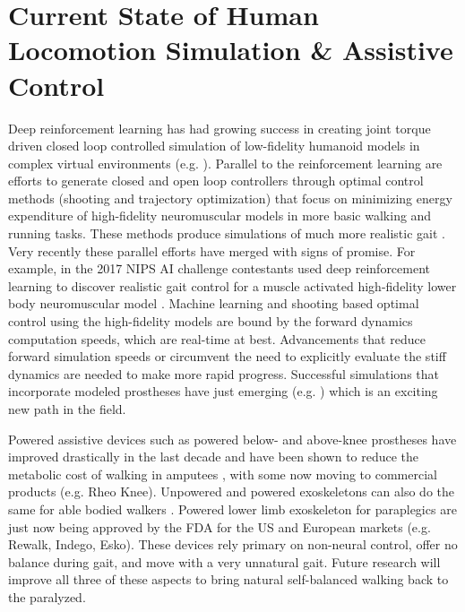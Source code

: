 \documentclass[letter,titlepage]{article}
\begin{document}
\section{Current State of Human Locomotion Simulation \& Assistive Control%
  \label{current-state-of-human-locomotion-simulation-assistive-control}%
}

Deep reinforcement learning has had growing success in creating joint torque
driven closed loop controlled simulation of low-fidelity humanoid models in
complex virtual environments (e.g. \cite{Tan2014,Heess2017}). Parallel to the
reinforcement learning are efforts to generate closed and open loop controllers
through optimal control methods (shooting and trajectory optimization) that
focus on minimizing energy expenditure of high-fidelity neuromuscular models in
more basic walking and running tasks. These methods produce simulations of much
more realistic gait \cite{Ackermann2010,vandenBogert2011,Wang2012,Geijtenbeek2013,Mordatch2013,Uchida2016,Dembia2017}. Very recently
these parallel efforts have merged with signs of promise. For example, in the
2017 NIPS AI challenge contestants used deep reinforcement learning to discover
realistic gait control for a muscle activated high-fidelity lower body
neuromuscular model \cite{Kidzinski2017}. Machine learning and shooting based
optimal control using the high-fidelity models are bound by the forward
dynamics computation speeds, which are real-time at best. Advancements that
reduce forward simulation speeds or circumvent the need to explicitly evaluate
the stiff dynamics are needed to make more rapid progress. Successful
simulations that incorporate modeled prostheses have just emerging (e.g.
\cite{Koelewijn2016}) which is an exciting new path in the field.

Powered assistive devices such as powered below- and above-knee prostheses have
improved drastically in the last decade and have been shown to reduce the
metabolic cost of walking in amputees \cite{Au2009}, with some now moving to
commercial products (e.g. Rheo Knee). Unpowered \cite{Collins2015} and powered
\cite{Zhang2017} exoskeletons can also do the same for able bodied walkers
\cite{Collins2015}. Powered lower limb exoskeleton for paraplegics are just now
being approved by the FDA for the US and European markets (e.g. Rewalk, Indego,
Esko). These devices rely primary on non-neural control, offer no balance
during gait, and move with a very unnatural gait. Future research will improve
all three of these aspects to bring natural self-balanced walking back to the
paralyzed.
\end{document}
